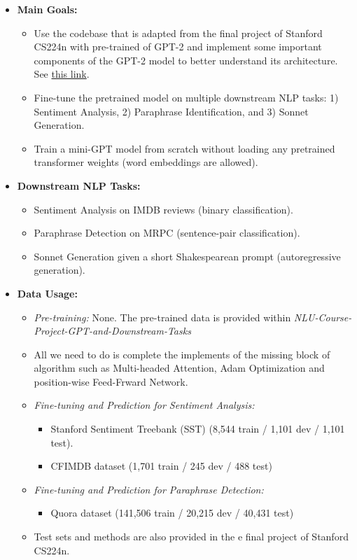 \documentclass{article}
\theoremstyle{definition}
\begin{document}
  \begin{itemize}
    \item \textbf{Main Goals:} 
      \begin{itemize}
        \item Use the codebase that is adapted from the final project of Stanford CS224n with pre-trained of GPT-2
        and implement some important components of the GPT-2 model to better understand its architecture.
        See \href{https://github.com/AGIXLab/NLU-Course-Project-GPT-and-Downstream-Tasks/tree/main}{this link}.
        \item Fine-tune the pretrained model on multiple downstream NLP tasks: 1)
        Sentiment Analysis, 2) Paraphrase Identification, and 3) Sonnet Generation.
        \item Train a mini-GPT model from scratch without loading any pretrained transformer weights (word embeddings are allowed).
      \end{itemize}
  
    \item \textbf{Downstream NLP Tasks:}
      \begin{itemize}
        \item Sentiment Analysis on IMDB reviews (binary classification).
        \item Paraphrase Detection on MRPC (sentence-pair classification).
        \item Sonnet Generation given a short Shakespearean prompt (autoregressive generation).
      \end{itemize}
  
    \item \textbf{Data Usage:}
      \begin{itemize}
        \item \emph{Pre-training:} None. The pre-trained data is provided within \emph{
          NLU-Course-Project-GPT-and-Downstream-Tasks}


        \item All we need to do is complete the implements of the missing block of algorithm such as Multi-headed Attention,
        Adam Optimization and position-wise Feed-Frward Network.
        \item \emph{Fine-tuning and Prediction for Sentiment Analysis:}
          \begin{itemize}
            \item Stanford Sentiment Treebank (SST) (8,544 train / 1,101 dev / 1,101 test).
            \item CFIMDB dataset (1,701 train / 245 dev / 488 test)
          \end{itemize}
        \item \emph{Fine-tuning and Prediction for Paraphrase Detection:}
          \begin{itemize}
            \item Quora dataset (141,506 train  / 20,215 dev / 40,431 test)
          \end{itemize}
        \item Test sets and methods are also provided in the e final project of
        Stanford CS224n.
      \end{itemize}
  

\end{itemize}
\end{document}
